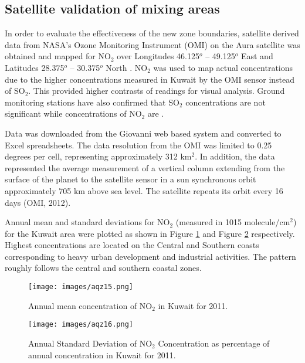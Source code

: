 \subsection{Satellite validation of mixing areas}

In order to evaluate the effectiveness of the new zone boundaries, satellite derived data from NASA’s Ozone Monitoring Instrument (OMI) on the Aura satellite was obtained and mapped for NO$_{2}$ over Longitudes 46.125$^{o}$ – 49.125$^{o}$ East and Latitudes 28.375$^{o}$ – 30.375$^{o}$ North \citep{Boersma2011, Strawa2013}.  NO$_{2}$ was used to map actual concentrations due to the higher concentrations measured in Kuwait by the OMI sensor instead of SO$_{2}$.  This provided higher contrasts of readings for visual analysis. Ground monitoring stations have also confirmed that SO$_{2}$ concentrations are not significant while concentrations of NO$_{2}$ are \citep{Al-Awadhi2014}.

Data was downloaded from the Giovanni web based system \citep{Acker2007} and converted to Excel spreadsheets.  The data resolution from the OMI was limited to 0.25 degrees per cell, representing approximately 312 km$^{2}$.  In addition, the data represented the average measurement of a vertical column extending from the surface of the planet to the satellite sensor in a sun synchronous orbit approximately 705 km above sea level.  The satellite repeats its orbit every 16 days (OMI, 2012). 

Annual mean and standard deviations for NO$_{2}$ (measured in 1015 molecule/cm$^{2}$) for the Kuwait area were plotted as shown in Figure \ref{fig:15meanNO2} and Figure \ref{fig:16stdNO2} respectively.  Highest concentrations are located on the Central and Southern coasts corresponding to heavy urban development and industrial activities. The pattern roughly follows the central and southern coastal zones.

%
\begin{figure}
\texttt{[image: images/aqz15.png]} 
\caption{Annual mean concentration of NO$_{2}$ in Kuwait for 2011.}
\label{fig:15meanNO2}
\end{figure}
%
%
\begin{figure}
\texttt{[image: images/aqz16.png]} 
\caption{Annual Standard Deviation of NO$_{2}$ Concentration as percentage of annual concentration in Kuwait for 2011.}
\label{fig:16stdNO2}
\end{figure}
%


